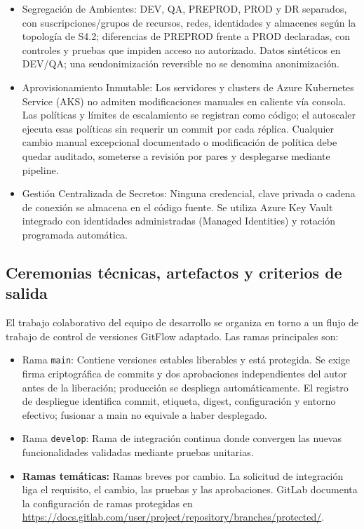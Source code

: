 \begin{itemize}
\item Segregación de Ambientes: DEV, QA, PREPROD, PROD y DR separados, con suscripciones/grupos de recursos, redes, identidades y almacenes según la topología de S4.2; diferencias de PREPROD frente a PROD declaradas, con controles y pruebas que impiden acceso no autorizado. Datos sintéticos en DEV/QA; una seudonimización reversible no se denomina anonimización.
\item Aprovisionamiento Inmutable: Los servidores y clusters de Azure Kubernetes Service (AKS) no admiten modificaciones manuales en caliente vía consola. Las políticas y límites de escalamiento se registran como código; el autoscaler ejecuta esas políticas sin requerir un commit por cada réplica. Cualquier cambio manual excepcional documentado o modificación de política debe quedar auditado, someterse a revisión por pares y desplegarse mediante pipeline.
\item Gestión Centralizada de Secretos: Ninguna credencial, clave privada o cadena de conexión se almacena en el código fuente. Se utiliza Azure Key Vault integrado con identidades administradas (Managed Identities) y rotación programada automática.
\end{itemize}

\FloatBarrier
\subsection{Ceremonias técnicas, artefactos y criterios de salida}\label{sec:6-desarrollo-ceremonias}\label{sec:06-ceremonias-tecnicas-artefactos-y-criterios-de-salida}

El trabajo colaborativo del equipo de desarrollo se organiza en torno a un flujo de trabajo de control de versiones GitFlow adaptado. Las ramas principales son:

\begin{itemize}
\item Rama \texttt{main}: Contiene versiones estables liberables y está protegida. Se exige firma criptográfica de commits y dos aprobaciones independientes del autor antes de la liberación; producción se despliega automáticamente. El registro de despliegue identifica commit, etiqueta, digest, configuración y entorno efectivo; fusionar a main no equivale a haber desplegado.
\item Rama \texttt{develop}: Rama de integración continua donde convergen las nuevas funcionalidades validadas mediante pruebas unitarias.
\item \textbf{Ramas temáticas:} Ramas breves por cambio. La solicitud de integración liga el requisito, el cambio, las pruebas y las aprobaciones. GitLab documenta la configuración de ramas protegidas en \url{https://docs.gitlab.com/user/project/repository/branches/protected/}.
\end{itemize}

